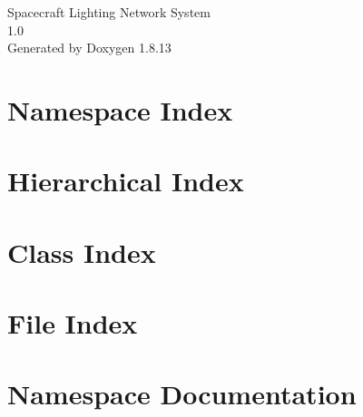 \documentclass[twoside]{book}
\newcommand{\+}{\discretionary{\mbox{\scriptsize$\hookleftarrow$}}{}{}}
\newcommand{\clearemptydoublepage}{%
  \newpage{\pagestyle{empty}\cleardoublepage}%
}
\begin{document}
\hypersetup{pageanchor=false,
             bookmarksnumbered=true,
             pdfencoding=unicode
            }
\begin{titlepage}
\vspace*{7cm}
\begin{center}%
{\Large Spacecraft Lighting Network System \\[1ex]\large 1.\+0 }\\
\vspace*{1cm}
{\large Generated by Doxygen 1.8.13}\\
\end{center}
\end{titlepage}
\clearemptydoublepage
{}
\tableofcontents
\clearemptydoublepage
{}
\hypersetup{pageanchor=true}

\chapter{Namespace Index}

\chapter{Hierarchical Index}

\chapter{Class Index}

\chapter{File Index}

\chapter{Namespace Documentation}












\end{document}
